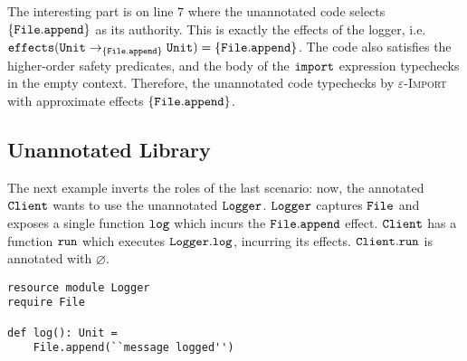 The interesting part  is on line $7$ where the unannotated code selects $\{ \mathtt{File.append} \}$ as its authority. This is exactly the effects of the logger, i.e. $\mathtt{effects}(\mathtt{Unit} \rightarrow_{\{\mathtt{File.append}\}} \mathtt{Unit}) = \{ \mathtt{File.append} \}$. The code also satisfies the higher-order safety predicates, and the body of the $\mathtt{import}$ expression typechecks in the empty context. Therefore, the unannotated code typechecks by \textsc{$\varepsilon$-Import} with approximate effects $\mathtt{\{ \mathtt{File.append} \}}$.


























































\subsection{Unannotated Library}

The next example inverts the roles of the last scenario: now, the annotated $\mathtt{Client}$ wants to use the unannotated $\mathtt{Logger}$. $\mathtt{Logger}$ captures $\mathtt{File}$ and exposes a single function $\mathtt{log}$ which incurs the $\mathtt{File.append}$ effect. $\mathtt{Client}$ has a function $\mathtt{run}$ which executes $\mathtt{Logger.log}$, incurring its effects. $\mathtt{Client.run}$ is annotated with $\varnothing$.

\begin{lstlisting}
resource module Logger
require File

def log(): Unit =
    File.append(``message logged'')
\end{lstlisting}

